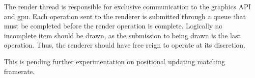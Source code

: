The render thread is responsible for exclusive communication to the graphics API and gpu. Each operation sent to the renderer is submitted through a queue that must be completed before the render operation is complete. Logically no incomplete item should be drawn, as the submission to being drawn is the last operation. Thus, the renderer should have free reign to operate at its discretion.

This is pending further experimentation on positional updating matching framerate.
